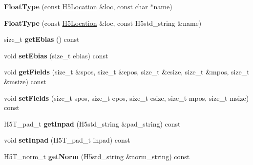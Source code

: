 \begin{DoxyCompactItemize}
\item 
\mbox{\label{class_h5_1_1_float_type_a65c94f3c69964e7d5f0866e5fef9a1b9}} 
{\bfseries Float\+Type} (const \hyperlink{class_h5_1_1_h5_location}{H5\+Location} \&loc, const char $\ast$name)
\item 
\mbox{\label{class_h5_1_1_float_type_a329b5c89a7c1e50838964d94d509bc82}} 
{\bfseries Float\+Type} (const \hyperlink{class_h5_1_1_h5_location}{H5\+Location} \&loc, const H5std\+\_\+string \&name)
\item 
\mbox{\label{class_h5_1_1_float_type_abd95daf11b1947da940c6710a3102142}} 
size\+\_\+t {\bfseries get\+Ebias} () const
\item 
\mbox{\label{class_h5_1_1_float_type_a61c6dd70e87bbd6648859389f0bd6386}} 
void {\bfseries set\+Ebias} (size\+\_\+t ebias) const
\item 
\mbox{\label{class_h5_1_1_float_type_a5b56f78edbcb97232133ac65612cb171}} 
void {\bfseries get\+Fields} (size\+\_\+t \&spos, size\+\_\+t \&epos, size\+\_\+t \&esize, size\+\_\+t \&mpos, size\+\_\+t \&msize) const
\item 
\mbox{\label{class_h5_1_1_float_type_a18cf6ab244d873c5dcd514ef5fb8b24d}} 
void {\bfseries set\+Fields} (size\+\_\+t spos, size\+\_\+t epos, size\+\_\+t esize, size\+\_\+t mpos, size\+\_\+t msize) const
\item 
\mbox{\label{class_h5_1_1_float_type_ad4d8570bb0ec01427c3fe51e2ebdcaea}} 
H5\+T\+\_\+pad\+\_\+t {\bfseries get\+Inpad} (H5std\+\_\+string \&pad\+\_\+string) const
\item 
\mbox{\label{class_h5_1_1_float_type_ae2ad7a8db9674b6e257c7ac2ca247125}} 
void {\bfseries set\+Inpad} (H5\+T\+\_\+pad\+\_\+t inpad) const
\item 
\mbox{\label{class_h5_1_1_float_type_a3a288b2690a2cfafa01343f44184f680}} 
H5\+T\+\_\+norm\+\_\+t {\bfseries get\+Norm} (H5std\+\_\+string \&norm\+\_\+string) const
\item 

\end{DoxyCompactItemize}
